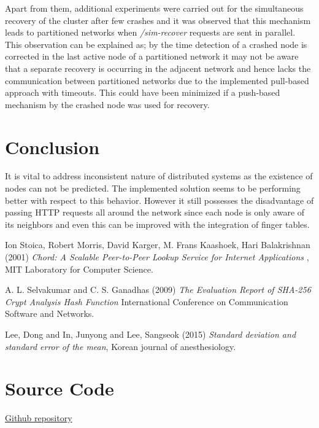 \documentclass[
    a4paper,
    twocolumn,
]{article}
\begin{document}
Apart from them, additional experiments were carried out for the simultaneous recovery of the cluster after few crashes and it was observed that this mechanism leads to partitioned networks when \textit{/sim-recover} requests are sent in parallel. This observation can be explained as; by the time detection of a crashed node is corrected in the last active node of a partitioned network it may not be aware that a separate recovery is occurring in the adjacent network and hence lacks the communication between partitioned networks due to the implemented pull-based approach with timeouts. This could have been minimized if a push-based mechanism by the crashed node was used for recovery.

\section{Conclusion}

It is vital to address inconsistent nature of distributed systems as the existence of nodes can not be predicted. The implemented solution seems to be performing better with respect to this behavior. However it still possesses the disadvantage of passing HTTP requests all around the network since each node is only aware of its neighbors and even this can be improved with the integration of finger tables. 

\begin{thebibliography}{9}	
	Ion Stoica, Robert Morris, David Karger, M. Frans Kaashoek, Hari Balakrishnan (2001) \emph{Chord: A Scalable Peer-to-Peer Lookup Service for Internet Applications }, MIT Laboratory for Computer Science.
	
	A. L. Selvakumar and C. S. Ganadhas (2009) \emph{The Evaluation Report of SHA-256 Crypt Analysis Hash Function} International Conference on Communication Software and Networks.
	
	Lee, Dong and In, Junyong and Lee, Sangseok (2015) \emph{Standard deviation and standard error of the mean}, Korean journal of anesthesiology.
\end{thebibliography}

\appendix
\section{Source Code}
\href{https://github.com/YasiruR/dht/tree/master}{Github repository}
\end{document}
